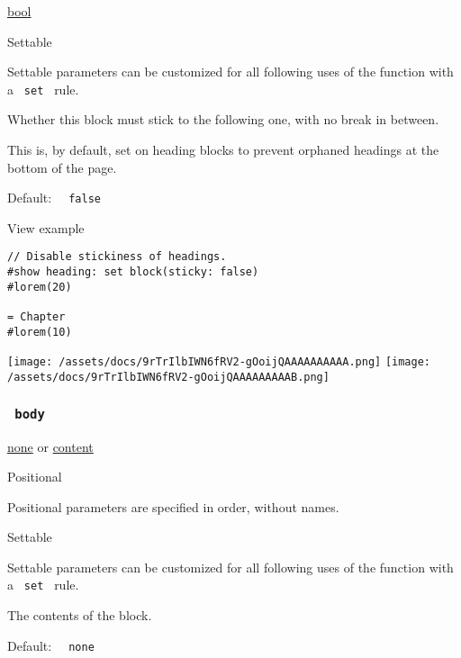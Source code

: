 \href{/docs/reference/foundations/bool/}{bool}

{{ Settable }}

\label{parameters-sticky-settable-tooltip}
Settable parameters can be customized for all following uses of the
function with a \texttt{\ set\ } rule.

Whether this block must stick to the following one, with no break in
between.

This is, by default, set on heading blocks to prevent orphaned headings
at the bottom of the page.

Default: \texttt{\ }{\texttt{\ false\ }}\texttt{\ }


View example

\begin{verbatim}
// Disable stickiness of headings.
#show heading: set block(sticky: false)
#lorem(20)

= Chapter
#lorem(10)
\end{verbatim}

\texttt{[image: /assets/docs/9rTrIlbIWN6fRV2-gOoijQAAAAAAAAAA.png]}
\texttt{[image: /assets/docs/9rTrIlbIWN6fRV2-gOoijQAAAAAAAAAB.png]}

\subsubsection{\texorpdfstring{\texttt{\ body\ }}{ body }}\label{parameters-body}

\href{/docs/reference/foundations/none/}{none} {or}
\href{/docs/reference/foundations/content/}{content}

{{ Positional }}

\label{parameters-body-positional-tooltip}
Positional parameters are specified in order, without names.

{{ Settable }}

\label{parameters-body-settable-tooltip}
Settable parameters can be customized for all following uses of the
function with a \texttt{\ set\ } rule.

The contents of the block.

Default: \texttt{\ }{\texttt{\ none\ }}\texttt{\ }

\href{/docs/reference/layout/angle/}{\pandocbounded{}}

